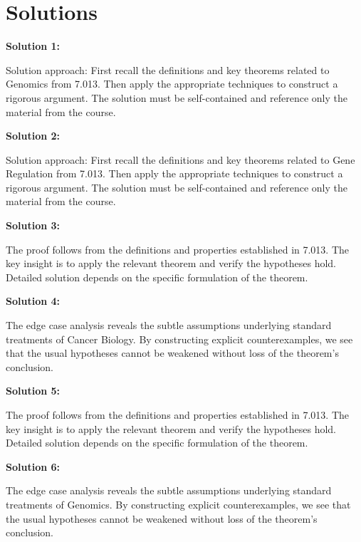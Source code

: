 \documentclass[12pt,a4paper]{exam}
\begin{document}
\newpage
\section*{Solutions}

\textbf{Solution 1:}

Solution approach: First recall the definitions and key theorems related to Genomics from 7.013. Then apply the appropriate techniques to construct a rigorous argument. The solution must be self-contained and reference only the material from the course.

\vspace{0.5cm}

\textbf{Solution 2:}

Solution approach: First recall the definitions and key theorems related to Gene Regulation from 7.013. Then apply the appropriate techniques to construct a rigorous argument. The solution must be self-contained and reference only the material from the course.

\vspace{0.5cm}

\textbf{Solution 3:}

The proof follows from the definitions and properties established in 7.013. The key insight is to apply the relevant theorem and verify the hypotheses hold. Detailed solution depends on the specific formulation of the theorem.

\vspace{0.5cm}

\textbf{Solution 4:}

The edge case analysis reveals the subtle assumptions underlying standard treatments of Cancer Biology. By constructing explicit counterexamples, we see that the usual hypotheses cannot be weakened without loss of the theorem's conclusion.

\vspace{0.5cm}

\textbf{Solution 5:}

The proof follows from the definitions and properties established in 7.013. The key insight is to apply the relevant theorem and verify the hypotheses hold. Detailed solution depends on the specific formulation of the theorem.

\vspace{0.5cm}

\textbf{Solution 6:}

The edge case analysis reveals the subtle assumptions underlying standard treatments of Genomics. By constructing explicit counterexamples, we see that the usual hypotheses cannot be weakened without loss of the theorem's conclusion.
\end{document}
